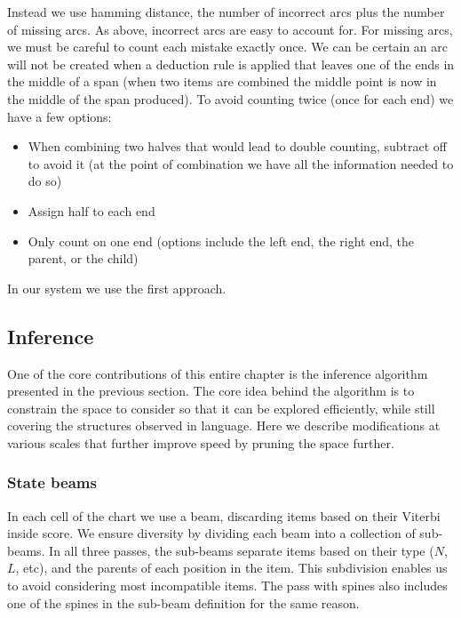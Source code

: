 Instead we use hamming distance, the number of incorrect arcs plus the number of missing arcs.
As above, incorrect arcs are easy to account for.
For missing arcs, we must be careful to count each mistake exactly once.
We can be certain an arc will not be created when a deduction rule is applied that leaves one of the ends in the middle of a span (\myeg when two items are combined the middle point is now in the middle of the span produced).
To avoid counting twice (once for each end) we have a few options:

\begin{itemize}
  \item When combining two halves that would lead to double counting, subtract off to avoid it (at the point of combination we have all the information needed to do so)
  \item Assign half to each end
  \item Only count on one end (options include the left end, the right end, the parent, or the child)
\end{itemize}

In our system we use the first approach.

\subsection{Inference}

One of the core contributions of this entire chapter is the inference algorithm presented in the previous section.
The core idea behind the algorithm is to constrain the space to consider so that it can be explored efficiently, while still covering the structures observed in language.
Here we describe modifications at various scales that further improve speed by pruning the space further.

\subsubsection{State beams}

In each cell of the chart we use a beam, discarding items based on their Viterbi inside score.
We ensure diversity by dividing each beam into a collection of sub-beams.
In all three passes, the sub-beams separate items based on their type ($N$, $L$, etc), and the parents of each position in the item.
This subdivision enables us to avoid considering most incompatible items.
The pass with spines also includes one of the spines in the sub-beam definition for the same reason.

